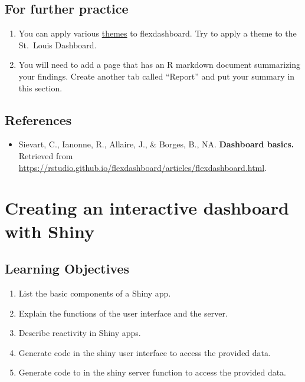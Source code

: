 \documentclass[
  krantz2]{krantz}
\providecommand{\tightlist}{%
  \setlength{\itemsep}{0pt}\setlength{\parskip}{0pt}}
\begin{document}
\hypertarget{flexdashboard-study}{%
\section{For further practice}\label{flexdashboard-study}}

\begin{enumerate}
\def\labelenumi{\arabic{enumi}.}
\tightlist
\item
  You can apply various \href{https://rstudio.github.io/flexdashboard/articles/theme.html}{themes} to flexdashboard. Try to apply a theme to the St.~Louis Dashboard.
\item
  You will need to add a page that has an R markdown document summarizing your findings. Create another tab called ``Report'' and put your summary in this section.
\end{enumerate}

\hypertarget{flexdashboard-resources}{%
\section{References}\label{flexdashboard-resources}}

\begin{itemize}
\tightlist
\item
  Sievart, C., Ianonne, R., Allaire, J., \& Borges, B., NA. \textbf{Dashboard basics.} Retrieved from \url{https://rstudio.github.io/flexdashboard/articles/flexdashboard.html}.
\end{itemize}

\hypertarget{shiny}{%
\chapter{Creating an interactive dashboard with Shiny}\label{shiny}}

\hypertarget{shiny-los}{%
\section{Learning Objectives}\label{shiny-los}}

\begin{enumerate}
\def\labelenumi{\arabic{enumi}.}
\tightlist
\item
  List the basic components of a Shiny app.
\item
  Explain the functions of the user interface and the server.
\item
  Describe reactivity in Shiny apps.
\item
  Generate code in the shiny user interface to access the provided data.
\item
  Generate code to in the shiny server function to access the provided data.
\end{enumerate}
\end{document}
